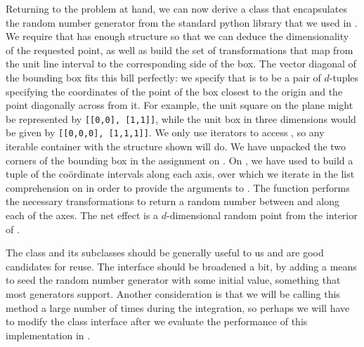 Returning to the problem at hand, we can now derive a class  that
encapsulates the random number generator from the standard python library that we used in
. We require that  has enough structure so that we can
deduce the dimensionality of the requested point, as well as build the set of transformations
that map from the unit line interval to the corresponding side of the box. The vector diagonal
of the bounding box fits this bill perfectly: we specify that  is to be a pair
of $d$-tuples specifying the coordinates of the point of the box closest to the origin and the
point diagonally across from it. For example, the unit square on the plane might be represented
by \mbox{\tt [[0,0], [1,1]]}, while the unit box in three dimensions would be given by
\mbox{\tt [[0,0,0], [1,1,1]]}.  We only use iterators to access , so any
iterable container with the structure shown will do.
%
%
We have unpacked the two corners of the bounding box in the assignment on
. On , we have used  to build a tuple of
the co\"ordinate intervals along each axis, over which we iterate in the list comprehension on
 in order to provide the arguments to . The function
 performs the necessary transformations to return a random number between
 and  along each of the axes. The net effect is
a $d$-dimensional random point from the interior of .

The class  and its subclasses should be generally useful to us and are good
candidates for reuse. The interface should be broadened a bit, by adding a means to seed the
random number generator with some initial value, something that most generators support.
Another consideration is that we will be calling this method a large number of times during the
integration, so perhaps we will have to modify the class interface after we evaluate the
performance of this implementation in .


